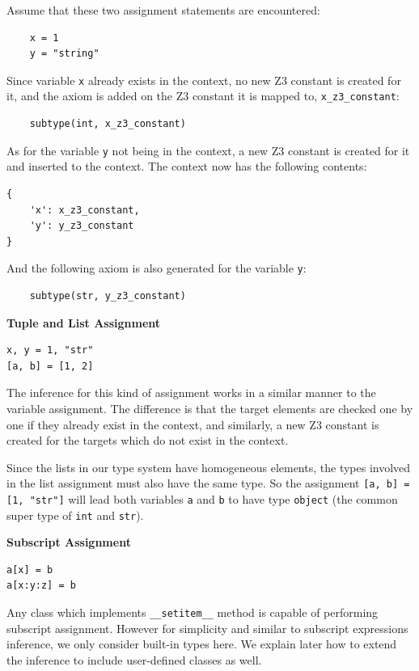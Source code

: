 Assume that these two assignment statements are encountered:
\begin{lstlisting}
	x = 1
	y = "string"
\end{lstlisting}

Since variable \lstinline|x| already exists in the context, no new Z3 constant is created for it, and the axiom is added on the Z3 constant it is mapped to, \lstinline|x_z3_constant|:
\begin{lstlisting}
	subtype(int, x_z3_constant)
\end{lstlisting}

As for the variable \lstinline|y| not being in the context, a new Z3 constant is created for it and inserted to the context. The context now has the following contents:
\begin{lstlisting}
{
	'x': x_z3_constant,
	'y': y_z3_constant
}
\end{lstlisting}

And the following axiom is also generated for the variable \lstinline|y|:
\begin{lstlisting}
	subtype(str, y_z3_constant)
\end{lstlisting}

\textbf{Tuple and List Assignment}
\begin{lstlisting}
x, y = 1, "str"
[a, b] = [1, 2]
\end{lstlisting}

The inference for this kind of assignment works in a similar manner to the variable assignment. The difference is that the target elements are checked one by one if they already exist in the context, and similarly, a new Z3 constant is created for the targets which do not exist in the context.

Since the lists in our type system have homogeneous elements, the types involved in the list assignment must also have the same type. So the assignment \lstinline|[a, b] = [1, "str"]| will lead both variables \lstinline|a| and \lstinline|b| to have type \lstinline|object| (the common super type of \lstinline|int| and \lstinline|str|).

\textbf{Subscript Assignment}
\begin{lstlisting}
a[x] = b
a[x:y:z] = b
\end{lstlisting}

Any class which implements \lstinline|__setitem__| method is capable of performing subscript assignment. However for simplicity and similar to subscript expressions inference, we only consider built-in types here. We explain later how to extend the inference to include user-defined classes as well.

